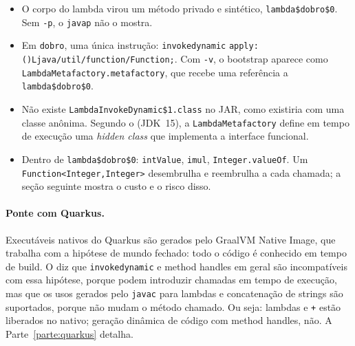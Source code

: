 \begin{itemize}
\item O corpo do lambda virou um método privado e sintético,
  \texttt{lambda\$dobro\$0}. Sem \texttt{-p}, o \texttt{javap} não o
  mostra.
\item Em \texttt{dobro}, uma única instrução: \texttt{invokedynamic}
  \nolinkurl{apply:()Ljava/util/function/Function;}. Com \texttt{-v}, o bootstrap
  aparece como \texttt{LambdaMetafactory.metafactory}, que recebe uma
  referência a \texttt{lambda\$dobro\$0}.
\item Não existe \texttt{LambdaInvokeDynamic\$1.class} no JAR, como
  existiria com uma classe anônima. Segundo o 
  (JDK~15), a \texttt{LambdaMetafactory} define em tempo de execução uma
  \emph{hidden class} que implementa a interface funcional.
\item Dentro de \texttt{lambda\$dobro\$0}: \texttt{intValue}, \texttt{imul},
  \texttt{Integer.valueOf}. Um \texttt{Function<Integer,\allowbreak Integer>}
  desembrulha e reembrulha a cada chamada; a seção seguinte mostra o
  custo e o risco disso.
\end{itemize}

\paragraph{Ponte com Quarkus.}
Executáveis nativos do Quarkus são gerados pelo GraalVM Native Image,
que trabalha com a hipótese de mundo fechado: todo o código é conhecido
em tempo de build. O  diz que
\texttt{invokedynamic} e method handles em geral são incompatíveis com
essa hipótese, porque podem introduzir chamadas em tempo de execução, mas
que os usos gerados pelo \texttt{javac} para lambdas e concatenação de
strings são suportados, porque não mudam o método chamado. Ou seja:
lambdas e \texttt{+} estão liberados no nativo; geração dinâmica de
código com method handles, não. A Parte~\ref{parte:quarkus} detalha.
